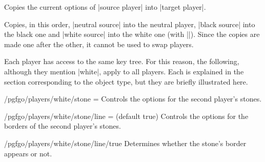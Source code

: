 \begin{goban}[9, stone = {radius = 4pt}, mark = {line = {color = red}}]
\begin{command}{\pgfgocopyplayer{}}
	Copies the current options of |source player| into |target player|.

	\begin{codeexample}[width=3cm]

		\begin{goban}[partial = A1:C3]
		\end{goban}
	\end{codeexample}
\end{command}

\begin{command}{\pgfgocopyplayers{}}
	Copies, in this order, |neutral source| into the neutral player, |black source| into the black one and |white source| into the white one (with |\pgfgocopyplayer|). Since the copies are made one after the other, it cannot be used to swap players.

	\begin{codeexample}[width=4cm]

		\begin{goban}[3]
		\end{goban}
	\end{codeexample}
\end{command}

\label{subsec:players}Each player has access to the same key tree. For this reason, the following, although they mention |white|, apply to all players. Each is explained in the section corresponding to the object type, but they are briefly illustrated here.

\begin{key}{/pgfgo/players/white/stone = }
	Controls the options for the second player’s stones.
\end{key}

\begin{key}{/pgfgo/players/white/stone/line =  (default true)}
	Controls the options for the borders of the second player’s stones.
\end{key}

\begin{key}{/pgfgo/players/white/stone/line/true}
	Determines whether the stone’s border appears or not.
	

\end{key}
\end{goban}
